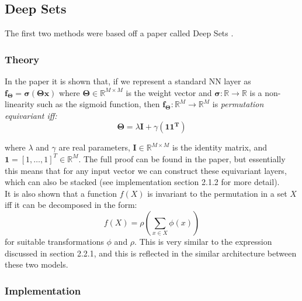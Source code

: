 \documentclass{article}
\begin{document}
\subsection{Deep Sets}
The first two methods were based off a paper called Deep Sets \cite{zaheer2018deepsets}.

\subsubsection{Theory}
In the paper it is shown that, if we represent a standard NN layer as  $\boldsymbol{f}_{\boldsymbol{\Theta}} = \boldsymbol{\sigma} \left( \boldsymbol{\Theta} \boldsymbol{x} \right)$ where $\boldsymbol{\Theta} \in \mathbb{R}^{M \times M}$ is the weight vector and $\boldsymbol{\sigma} : \mathbb{R} \rightarrow \mathbb{R}$ is a non-linearity such as the sigmoid function, then $\boldsymbol{f}_{\boldsymbol{\Theta}}: \mathbb{R}^M \rightarrow \mathbb{R}^M$ is \emph{permutation equivariant iff:}
\begin{equation}
    \boldsymbol{\Theta} = \lambda \boldsymbol{I} + \gamma \left(\boldsymbol{1}\boldsymbol{1^T}\right)
\end{equation}


\indent where $\lambda$ and $\gamma$ are real parameters, $\boldsymbol{I} \in \mathbb{R}^{M \times M}$ is the identity matrix, and $\boldsymbol{1} = \left[1, \ldots ,1 \right]^T \in \mathbb{R}^M$. The full proof can be found in the paper, but essentially this means that for any input vector we can construct these equivariant layers, which can also be stacked (see implementation section 2.1.2 for more detail).\\

\indent It is also shown that a function \( f(X) \) is invariant to the permutation in a set \( X \) iff it can be decomposed in the form: 
\begin{equation}
    f(X) =
\rho \left( \sum_{x \in X} \phi(x) \right)
\end{equation} 
\indent for suitable transformations \( \phi \) and \( \rho \). This is very similar to the expression discussed in section 2.2.1, and this is reflected in the similar architecture between these two models. \\  

\subsubsection{Implementation}
\end{document}
